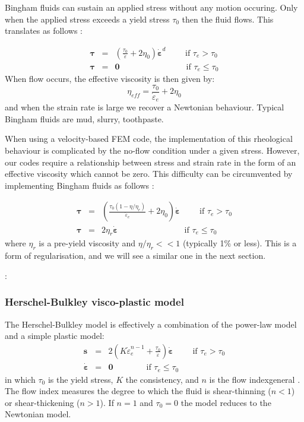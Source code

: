 Bingham fluids can sustain an applied stress without any motion occuring. Only when the applied stress exceeds
a yield stress $\tau_0$ then the fluid flows. This translates as follows \cite{reddybook2}:

\begin{eqnarray}
{\bm \tau} &=& \left(  \frac{\tau_0}{\dot{\varepsilon}} + 2 \eta_0  \right)\dot{\bm \varepsilon}^d \qquad 
\text{ if } {\tau}_{e}>\tau_0 \\
{\bm \tau} &=& {\bm 0} \qquad\qquad\qquad\qquad  \text{if } \tau_{e} \leq \tau_0 
\end{eqnarray}
When flow occurs, the effective viscosity is then given by:
\[
\eta_{eff} =  \frac{\tau_0}{\dot{\varepsilon}_e} + 2 \eta_0 
\]
and when the strain rate is large we recover a Newtonian behaviour.
Typical Bingham fluids are mud, slurry, toothpaste.  

When using a velocity-based FEM code, the implementation of this rheological behaviour 
is complicated by the no-flow condition under a given stress. However, our codes
require a relationship between stress and strain rate in the form of an effective viscosity
which cannot be zero. 
This difficulty can be circumvented by implementing Bingham fluids as follows \cite{reddybook2}:

\begin{eqnarray}
{\bm \tau} &=& \left(  \frac{\tau_0(1-\eta/\eta_r)}{\dot{\varepsilon}_e} 
+ 2 \eta_0  \right)\dot{\bm \varepsilon} \qquad \text{ if } \tau_{e}>\tau_0 \\
{\bm \tau} &=& 2 \eta_r \dot{\bm \varepsilon}  \qquad\qquad\qquad\qquad  
\text{if } \tau_{e} \leq \tau_0 
\end{eqnarray}
where $\eta_r$ is a pre-yield viscosity and $\eta/\eta_r<<1$ (typically 1\% or less). This is a form of 
regularisation, and we will see a similar one in the next section.

\Literature: \cite{papa87,blmi97,mizi01,limd02,maky17,syga14,bingham,baru09,been80,svna18}

\subsubsection{Herschel-Bulkley visco-plastic model}

The Herschel-Bulkley model is effectively a combination of the power-law model and 
a simple plastic model:
\begin{eqnarray}
{\bm s} &=& 2 \left(  K \dot{\varepsilon}_e^{n-1} + \frac{\tau_0}{\dot{\varepsilon}}\right)\dot{\bm \varepsilon} \qquad \text{ if } {\tau}_{e}>\tau_0 \\
\dot{\bm \varepsilon} &=& {\bm 0} \qquad\qquad \text{if }{\tau}_{e} \leq \tau_0 
\end{eqnarray}
in which $\tau_0$ is the yield stress, $K$ the consistency, and $n$ is the flow index{general} \cite{demj04}.
The flow index measures the degree to which the fluid is shear-thinning ($n<1$) or shear-thickening ($n>1$).
If $n=1$ and $\tau_0=0$ the model reduces to the Newtonian model. 

